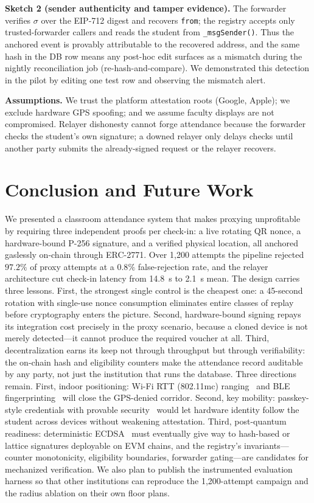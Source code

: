 \documentclass[conference]{IEEEtran}
\begin{document}
\noindent\textbf{Sketch 2 (sender authenticity and tamper evidence).} The
forwarder verifies $\sigma$ over the EIP-712 digest and recovers
\texttt{from}; the registry accepts only trusted-forwarder callers and reads
the student from \texttt{\_msgSender()}. Thus the anchored event is
provably attributable to the recovered address, and the same hash in the DB
row means any post-hoc edit surfaces as a mismatch during the nightly
reconciliation job (re-hash-and-compare). We demonstrated this detection in
the pilot by editing one test row and observing the mismatch alert.

\noindent\textbf{Assumptions.} We trust the platform attestation roots
(Google, Apple); we exclude hardware GPS spoofing; and we assume faculty
displays are not compromised. Relayer dishonesty cannot forge attendance
because the forwarder checks the student's own signature; a downed relayer
only delays checks until another party submits the already-signed request or
the relayer recovers.

\section{Conclusion and Future Work}
We presented a classroom attendance system that makes proxying unprofitable by
requiring three independent proofs per check-in: a live rotating QR nonce, a
hardware-bound P-256 signature, and a verified physical location, all anchored
gaslessly on-chain through ERC-2771. Over 1{,}200 attempts the pipeline
rejected $97.2\%$ of proxy attempts at a $0.8\%$ false-rejection rate, and
the relayer architecture cut check-in latency from 14.8~s to 2.1~s mean.
The design carries three lessons. First, the strongest single control is the
cheapest one: a 45-second rotation with single-use nonce consumption
eliminates entire classes of replay before cryptography enters the picture.
Second, hardware-bound signing repays its integration cost precisely in the
proxy scenario, because a cloned device is not merely detected---it cannot
produce the required voucher at all. Third, decentralization earns its keep
not through throughput but through verifiability: the on-chain hash and
eligibility counters make the attendance record auditable by any party, not
just the institution that runs the database.
Three directions remain. First, indoor positioning: Wi-Fi RTT
(802.11mc) ranging~\cite{ma2022wifi} and BLE fingerprinting~\cite{faragher2015location}
will close the GPS-denied corridor. Second, key mobility: passkey-style
credentials with provable security~\cite{Bindel2023FIDO2} would let hardware
identity follow the student across devices without weakening attestation.
Third, post-quantum readiness: deterministic ECDSA~\cite{pornin2013rfc6979}
must eventually give way to hash-based or lattice signatures deployable on
EVM chains, and the registry's invariants---counter monotonicity, eligibility
boundaries, forwarder gating---are candidates for mechanized verification.
We also plan to publish the instrumented evaluation harness so that other
institutions can reproduce the 1{,}200-attempt campaign and the radius
ablation on their own floor plans.



\end{document}
